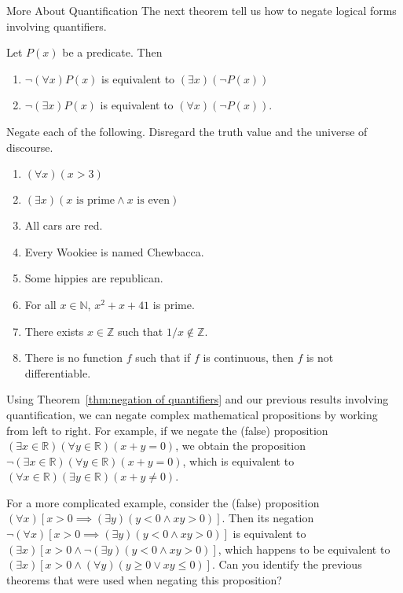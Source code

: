 \begin{section}{More About Quantification}
The next theorem tell us how to negate logical forms involving quantifiers.

\begin{theorem}\label{thm:negation of quantifiers}
Let $P(x)$ be a predicate.  Then
\begin{enumerate}[label=\textrm{(\alph*)}]
\item $\neg (\forall x)P(x)$ is equivalent to $(\exists x)(\neg P(x))$
\item $\neg (\exists x)P(x)$ is equivalent to $(\forall x)(\neg P(x))$.
\end{enumerate}
\end{theorem}

\begin{exercise}
Negate each of the following.  Disregard the truth value and the universe of discourse.
\begin{enumerate}[label=\textrm{(\alph*)}]
\item $(\forall x)(x>3)$
\item $(\exists x)(x \mbox{ is prime}\wedge x \mbox{ is even})$
\item All cars are red.
\item Every Wookiee is named Chewbacca.
\item Some hippies are republican.
\item For all $x\in\mathbb{N}$, $x^2+x+41$ is prime.
\item There exists $x\in\mathbb{Z}$ such that $1/x\notin\mathbb{Z}$.
\item There is no function $f$ such that if $f$ is continuous, then $f$ is not differentiable.
\end{enumerate}
\end{exercise}

Using Theorem~\ref{thm:negation of quantifiers} and our previous results involving quantification, we can negate complex mathematical propositions by working from left to right. For example, if we negate the (false) proposition $(\exists x\in\mathbb{R})(\forall y\in\mathbb{R})(x+y=0)$, we obtain the proposition $\neg(\exists x\in\mathbb{R})(\forall y\in\mathbb{R})(x+y=0)$, which is equivalent to $(\forall x\in\mathbb{R})(\exists y\in\mathbb{R})(x+y\neq 0)$. 

For a more complicated example, consider the (false) proposition $(\forall x)[x>0\implies (\exists y)(y<0 \wedge xy>0)]$. Then its negation $\neg (\forall x)[x>0\implies (\exists y)(y<0 \wedge xy>0)]$ is equivalent to $(\exists x)[x>0 \wedge \neg (\exists y)(y<0 \wedge xy>0)]$, which happens to be equivalent to $(\exists x)[x>0 \wedge (\forall y)(y\geq 0 \vee xy\leq 0)]$. Can you identify the previous theorems that were used when negating this proposition?


\end{section}

